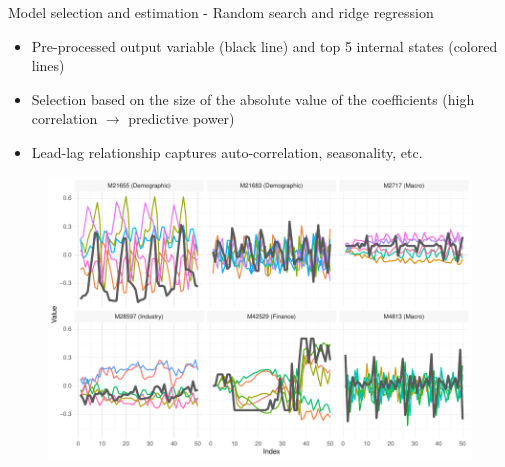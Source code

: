 \documentclass[aspectratio=169]{beamer}
\begin{document}
\begin{frame}[t]{Model selection and estimation - Random search and ridge regression}
    \begin{minipage}[t]{0.3\textwidth}
        \vspace{0pt}
        \begin{itemize}
            \item Pre-processed output variable (black line) and top 5 internal states (colored lines)
			\item Selection based on the size of the absolute value of the coefficients (high correlation $\rightarrow$ predictive power)
			\item Lead-lag relationship captures auto-correlation, seasonality, etc.
        \end{itemize}
    \end{minipage}%
    \hfill
    \begin{minipage}[t]{0.7\textwidth}
        \vspace{0pt}
 		\begin{figure}[H]
		\center
			\includegraphics[scale=0.7]{figures/figure_06_model_states_top_wide.pdf}
		\end{figure}
    \end{minipage}
\end{frame}
\end{document}
